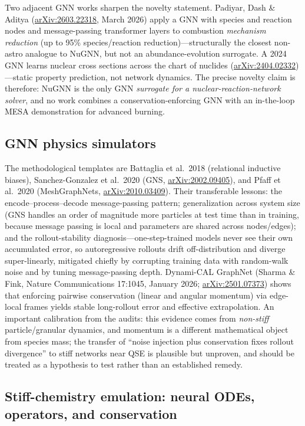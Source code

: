 \documentclass[11pt,a4paper]{article}
\newcommand{\arxiv}[1]{\href{https://arxiv.org/abs/#1}{arXiv:#1}}
\begin{document}
Two adjacent GNN works sharpen the novelty statement. Padiyar, Dash \& Aditya (\arxiv{2603.22318}, March 2026) apply a GNN with species and reaction nodes and message-passing transformer layers to combustion \emph{mechanism reduction} (up to 95\% species/reaction reduction)---structurally the closest non-astro analogue to NuGNN, but not an abundance-evolution surrogate. A 2024 GNN learns nuclear cross sections across the chart of nuclides (\arxiv{2404.02332})---static property prediction, not network dynamics. The precise novelty claim is therefore: NuGNN is the only GNN \emph{surrogate for a nuclear-reaction-network solver}, and no work combines a conservation-enforcing GNN with an in-the-loop MESA demonstration for advanced burning.

\subsection{GNN physics simulators}

The methodological templates are Battaglia et al.\ 2018 (relational inductive biases), Sanchez-Gonzalez et al.\ 2020 (GNS, \arxiv{2002.09405}), and Pfaff et al.\ 2020 (MeshGraphNets, \arxiv{2010.03409}). Their transferable lessons: the encode--process--decode message-passing pattern; generalization across system size (GNS handles an order of magnitude more particles at test time than in training, because message passing is local and parameters are shared across nodes/edges); and the rollout-stability diagnosis---one-step-trained models never see their own accumulated error, so autoregressive rollouts drift off-distribution and diverge super-linearly, mitigated chiefly by corrupting training data with random-walk noise and by tuning message-passing depth. Dynami-CAL GraphNet (Sharma \& Fink, Nature Communications 17:1045, January 2026; \arxiv{2501.07373}) shows that enforcing pairwise conservation (linear and angular momentum) via edge-local frames yields stable long-rollout error and effective extrapolation. An important calibration from the audits: this evidence comes from \emph{non-stiff} particle/granular dynamics, and momentum is a different mathematical object from species mass; the transfer of ``noise injection plus conservation fixes rollout divergence'' to stiff networks near QSE is plausible but unproven, and should be treated as a hypothesis to test rather than an established remedy.

\subsection{Stiff-chemistry emulation: neural ODEs, operators, and conservation}
\end{document}
